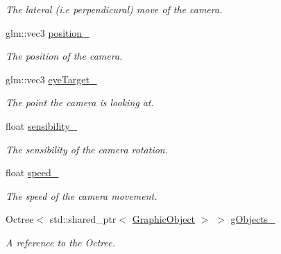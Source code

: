 \begin{DoxyCompactItemize}
\begin{DoxyCompactList}\small\item\em The lateral (i.\+e perpendicural) move of the camera. \end{DoxyCompactList}\item 
\hypertarget{classCamera_a37ad3807cdae28452b1826659ee81b3e}{}glm\+::vec3 \hyperlink{classCamera_a37ad3807cdae28452b1826659ee81b3e}{position\+\_\+}\label{classCamera_a37ad3807cdae28452b1826659ee81b3e}

\begin{DoxyCompactList}\small\item\em The position of the camera. \end{DoxyCompactList}\item 
\hypertarget{classCamera_a18a5a0f6e51878a69a052317532bf8f2}{}glm\+::vec3 \hyperlink{classCamera_a18a5a0f6e51878a69a052317532bf8f2}{eye\+Target\+\_\+}\label{classCamera_a18a5a0f6e51878a69a052317532bf8f2}

\begin{DoxyCompactList}\small\item\em The point the camera is looking at. \end{DoxyCompactList}\item 
\hypertarget{classCamera_a2b5914942cc2b10cd5f192f179b9f7ac}{}float \hyperlink{classCamera_a2b5914942cc2b10cd5f192f179b9f7ac}{sensibility\+\_\+}\label{classCamera_a2b5914942cc2b10cd5f192f179b9f7ac}

\begin{DoxyCompactList}\small\item\em The sensibility of the camera rotation. \end{DoxyCompactList}\item 
\hypertarget{classCamera_ac6e79c6e2ba82ffd315458eb6940ece4}{}float \hyperlink{classCamera_ac6e79c6e2ba82ffd315458eb6940ece4}{speed\+\_\+}\label{classCamera_ac6e79c6e2ba82ffd315458eb6940ece4}

\begin{DoxyCompactList}\small\item\em The speed of the camera movement. \end{DoxyCompactList}\item 
\hypertarget{classCamera_a6eb4aecc1fbea0713079b1f1880322bc}{}Octree$<$ std\+::shared\+\_\+ptr$<$ \hyperlink{classGraphicObject}{Graphic\+Object} $>$ $>$ \hyperlink{classCamera_a6eb4aecc1fbea0713079b1f1880322bc}{g\+Objects\+\_\+}\label{classCamera_a6eb4aecc1fbea0713079b1f1880322bc}

\begin{DoxyCompactList}\small\item\em A reference to the Octree. \end{DoxyCompactList}\end{DoxyCompactItemize}


